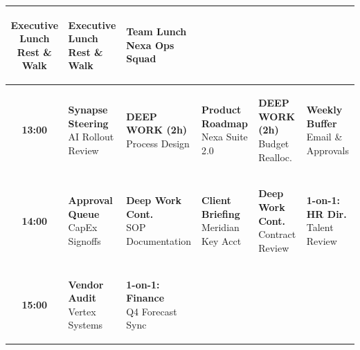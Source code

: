 \documentclass[10pt, landscape]{article}
\begin{document}
\begin{minipage}[t]{0.72\linewidth}
\begin{tabularx}{\linewidth}{|c|>{\raggedright\arraybackslash}X|>{\raggedright\arraybackslash}X|>{\raggedright\arraybackslash}X|>{\raggedright\arraybackslash}X|>{\raggedright\arraybackslash}X|}
    \colorbox{PersonalBg}{\parbox[t]{0.92\linewidth}{\tiny\color{PersonalTxt}\textbf{Executive Lunch}\\Rest \& Walk}} &
    \colorbox{PersonalBg}{\parbox[t]{0.92\linewidth}{\tiny\color{PersonalTxt}\textbf{Executive Lunch}\\Rest \& Walk}} &
    \colorbox{PersonalBg}{\parbox[t]{0.92\linewidth}{\tiny\color{PersonalTxt}\textbf{Team Lunch}\\Nexa Ops Squad}} \\
    \hline
    \textbf{13:00} &
    \colorbox{MeetingBg}{\parbox[t]{0.92\linewidth}{\tiny\color{MeetingTxt}\textbf{Synapse Steering}\\AI Rollout Review}} &
    \colorbox{DeepWorkBg}{\parbox[t]{0.92\linewidth}{\tiny\color{DeepWorkTxt}\textbf{DEEP WORK (2h)}\\Process Design}} &
    \colorbox{MeetingBg}{\parbox[t]{0.92\linewidth}{\tiny\color{MeetingTxt}\textbf{Product Roadmap}\\Nexa Suite 2.0}} &
    \colorbox{DeepWorkBg}{\parbox[t]{0.92\linewidth}{\tiny\color{DeepWorkTxt}\textbf{DEEP WORK (2h)}\\Budget Realloc.}} &
    \colorbox{AdminBg}{\parbox[t]{0.92\linewidth}{\tiny\color{AdminTxt}\textbf{Weekly Buffer}\\Email \& Approvals}} \\
    \hline
    \textbf{14:00} &
    \colorbox{AdminBg}{\parbox[t]{0.92\linewidth}{\tiny\color{AdminTxt}\textbf{Approval Queue}\\CapEx Signoffs}} &
    \colorbox{DeepWorkBg}{\parbox[t]{0.92\linewidth}{\tiny\color{DeepWorkTxt}\textbf{Deep Work Cont.}\\SOP Documentation}} &
    \colorbox{ClientBg}{\parbox[t]{0.92\linewidth}{\tiny\color{ClientTxt}\textbf{Client Briefing}\\Meridian Key Acct}} &
    \colorbox{DeepWorkBg}{\parbox[t]{0.92\linewidth}{\tiny\color{DeepWorkTxt}\textbf{Deep Work Cont.}\\Contract Review}} &
    \colorbox{MeetingBg}{\parbox[t]{0.92\linewidth}{\tiny\color{MeetingTxt}\textbf{1-on-1: HR Dir.}\\Talent Review}} \\
    \hline
    \textbf{15:00} &
    \colorbox{ClientBg}{\parbox[t]{0.92\linewidth}{\tiny\color{ClientTxt}\textbf{Vendor Audit}\\Vertex Systems}} &
    \colorbox{MeetingBg}{\parbox[t]{0.92\linewidth}{\tiny\color{MeetingTxt}\textbf{1-on-1: Finance}\\Q4 Forecast Sync}} &

\end{tabularx}
\end{minipage}
\end{document}
